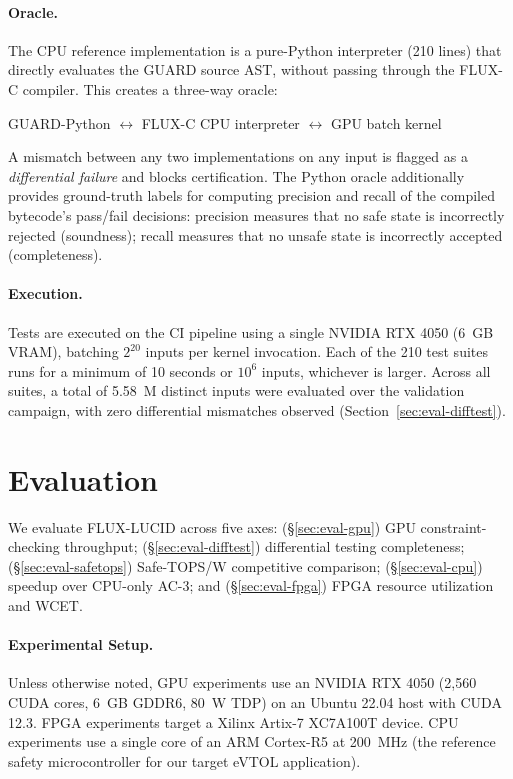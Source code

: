 \documentclass[conference]{IEEEtran}
\begin{document}
\paragraph{Oracle.}
The CPU reference implementation is a pure-Python interpreter (210 lines)
that directly evaluates the GUARD source AST, without passing through the
FLUX-C compiler. This creates a three-way oracle:

\begin{center}
GUARD-Python $\longleftrightarrow$ FLUX-C CPU interpreter
$\longleftrightarrow$ GPU batch kernel
\end{center}

A mismatch between any two implementations on any input is flagged as a
\emph{differential failure} and blocks certification.
The Python oracle additionally provides ground-truth labels for computing
precision and recall of the compiled bytecode's pass/fail decisions:
precision measures that no safe state is incorrectly rejected
(soundness); recall measures that no unsafe state is incorrectly accepted
(completeness).

\paragraph{Execution.}
Tests are executed on the CI pipeline using a single NVIDIA RTX 4050
(6~GB VRAM), batching $2^{20}$ inputs per kernel invocation.
Each of the 210 test suites runs for a minimum of 10 seconds or
$10^6$ inputs, whichever is larger.
Across all suites, a total of 5.58~M distinct inputs were evaluated over
the validation campaign, with zero differential mismatches observed
(Section~\ref{sec:eval-difftest}).

\section{Evaluation}
\label{sec:evaluation}

We evaluate FLUX-LUCID across five axes:
(§\ref{sec:eval-gpu}) GPU constraint-checking throughput;
(§\ref{sec:eval-difftest}) differential testing completeness;
(§\ref{sec:eval-safetops}) Safe-TOPS/W competitive comparison;
(§\ref{sec:eval-cpu}) speedup over CPU-only AC-3;
and (§\ref{sec:eval-fpga}) FPGA resource utilization and WCET.

\paragraph{Experimental Setup.}
Unless otherwise noted, GPU experiments use an NVIDIA RTX 4050 (2,560 CUDA
cores, 6~GB GDDR6, 80~W TDP) on an Ubuntu 22.04 host with CUDA 12.3.
FPGA experiments target a Xilinx Artix-7 XC7A100T device.
CPU experiments use a single core of an ARM Cortex-R5 at 200~MHz
(the reference safety microcontroller for our target eVTOL application).
\end{document}
